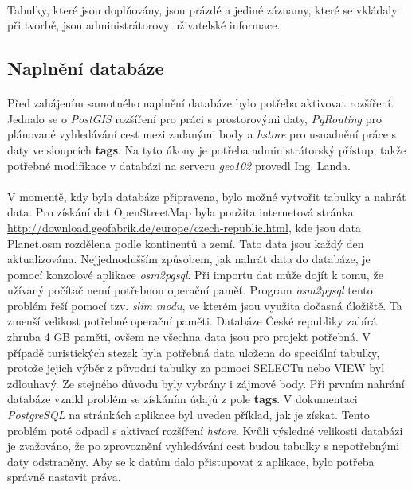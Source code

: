 \documentclass[11pt,a4paper,titlepage,oneside]{book}
\begin{document}
			\paragraph{}Tabulky, které jsou doplňovány, jsou prázdé a jediné záznamy, které se vkládaly při tvorbě, jsou administrátorovy uživatelské informace.

			\subsection{Naplnění databáze}
				\paragraph{} Před zahájením samotného naplnění databáze bylo potřeba aktivovat rozšíření. Jednalo se o \textit{PostGIS} rozšíření pro práci s prostorovými daty, \textit{PgRouting} pro plánované vyhledávání cest mezi zadanými body a \textit{hstore} pro usnadnění práce s daty ve sloupcích \textbf{tags}. Na tyto úkony je potřeba administrátorský přístup, takže potřebné modifikace v databázi na serveru \textit{geo102} provedl Ing. Landa.
				\paragraph{} V momentě, kdy byla databáze připravena, bylo možné vytvořit tabulky a nahrát data. Pro získání dat OpenStreetMap byla použita internetová stránka \url{http://download.geofabrik.de/europe/czech-republic.html}, kde jsou data Planet.osm rozdělena podle kontinentů a zemí. Tato data jsou každý den aktualizována. Nejjednodušším způsobem, jak nahrát data do databáze, je pomocí konzolové aplikace \textit{osm2pgsql}. Při importu dat může dojít k tomu, že užívaný počítač nemí potřebnou operační paměť. Program \textit{osm2pgsql} tento problém řeší pomocí tzv. \textit{slim modu}, ve kterém jsou využita dočasná úložiště. Ta zmenší velikost potřebné operační paměti. Databáze České republiky zabírá zhruba 4 GB paměti, ovšem ne všechna data jsou pro projekt potřebná. V případě turistických stezek byla potřebná data uložena do speciální tabulky, protože jejich výběr z původní tabulky za pomoci SELECTu nebo VIEW byl zdlouhavý. Ze stejného důvodu byly vybrány i zájmové body. Při prvním nahrání databáze vznikl problém se získáním údajů z pole \textbf{tags}. V dokumentaci \textit{PostgreSQL} na stránkách aplikace byl uveden příklad, jak je získat. Tento problém poté odpadl s aktivací rozšíření \textit{hstore}. Kvůli výsledné velikosti databázi je zvažováno, že po zprovoznění vyhledávání cest budou tabulky s nepotřebnými daty odstraněny. Aby se k datům dalo přistupovat z aplikace, bylo potřeba správně nastavit práva.
\end{document}
